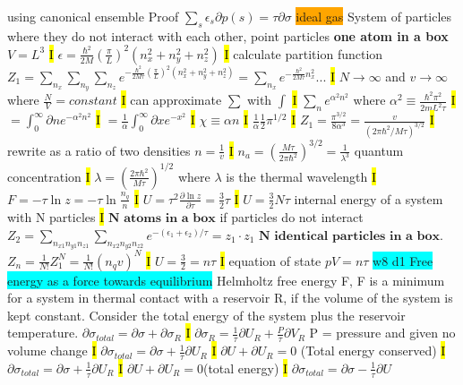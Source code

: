 \documentclass[fontsize=4pt]{scrartcl}
\begin{document}
\colorbox{Periwinkle}{using canonical ensemble Proof}
$\sum_s \epsilon_s \partial p(s) = \tau \partial \sigma$
\colorbox{Orange}{ideal gas}
System of particles where they do not interact with each other, point particles
\textbf{one atom in a box}
$V = L^3$
\hl{I}
$\epsilon = \frac{\hbar^2}{2M}(\frac{\pi}{L})^2 (n_x^2 + n_y^2 + n_z^2)$
\hl{I}
calculate partition function
$Z_1 = \sum_{n_x} \sum_{n_y} \sum_{n_z} e^{-\frac{\hbar^2}{2M\tau} (\frac{\pi}{L})^2 (n_x^2 + n_y^2 + n_z^2)} = \sum_{n_x}  e^{-\frac{\hbar^2}{2M\tau}  n_x^2} ...$ 
\hl{I}
$N \rightarrow \infty$ and $v \rightarrow \infty$ where $\frac{N}{V} = constant$
\hl{I}
can approximate $\sum$ with $\int$
\hl{I}
$\sum_n e^{\alpha^2 n^2}$ where $\alpha^2 \equiv \frac{\hbar^2 \pi^2}{2mL^2 \tau}$
\hl{I}
$=\int_0^{\infty} \partial n e^{-\alpha^2 n^2}$
\hl{I}
$= \frac{1}{\alpha} \int_0^{\infty} \partial x e^{-x^2}$
\hl{I}
$\chi \equiv \alpha n$
\hl{I}
$\frac{1}{\alpha}\frac{1}{2}\pi^{1/2}$
\hl{I}
$Z_1 = \frac{\pi^{3/2}}{8 \alpha^3} = \frac{v}{(2\pi \hbar^2 / M\tau)^{3/2}}$
\hl{I}
rewrite as a ratio of two densities $n=\frac{1}{v}$
\hl{I}
$n_a = (\frac{M\tau}{2\pi \hbar^2})^{3/2} = \frac{1}{\lambda^3}$ quantum concentration
\hl{I}
$\lambda = (\frac{2\pi \hbar^2}{M\tau})^{1/2}$ where $\lambda $ is the thermal wavelength
\hl{I}
$F=-\tau \ln z = -\tau \ln \frac{n_q}{n}$
\hl{I}
$U= \tau^2 \frac{\partial \ln z}{\partial \tau} = \frac{3}{2}\tau $
\hl{I}
$U = \frac{3}{2} N\tau$ internal energy of a system with N particles
\hl{I}
$\textbf{N atoms in a box}$ if particles do not interact
$Z_2 = \sum_{n_{x1} n_{y1} n_{z1}} \sum_{n_{x2} n_{y2} n_{z2}} e^{-(\epsilon_1 + \epsilon_2)/\tau} = z_1 \cdot z_1$
$\textbf{N identical particles in a box}$.
$Z_n = \frac{1}{N!} Z_1^N = \frac{1}{N!}(n_q v)^N$
\hl{I}
$U=\frac{3}{2}=n\tau$
\hl{I}
equation of state $pV = n\tau$
\colorbox{Cyan}{w8 d1 Free energy as a force towards equilibrium}
Helmholtz free energy F, F is a minimum for a system in thermal contact with a reservoir R, if the volume of the system is kept constant. Consider the total energy of the system plus the reservoir temperature.
$\partial \sigma_{total} = \partial \sigma + \partial \sigma_R$
\hl{I}
$\partial \sigma_R = \frac{1}{\tau} \partial U_R + \frac{P}{\tau} \partial V_R$ P = pressure and given no volume change
\hl{I}
$\partial \sigma_{total} = \partial \sigma + \frac{1}{\tau} \partial U_R$
\hl{I}
$\partial U + \partial U_R = 0$ (Total energy conserved)
\hl{I}
$\partial \sigma_{total} = \partial \sigma + \frac{1}{\tau} \partial U_R$
\hl{I}
$\partial U + \partial U_R = 0 $(total energy)
\hl{I}
$\partial \sigma_{total} = \partial \sigma - \frac{1}{\tau} \partial U$
\end{document}
